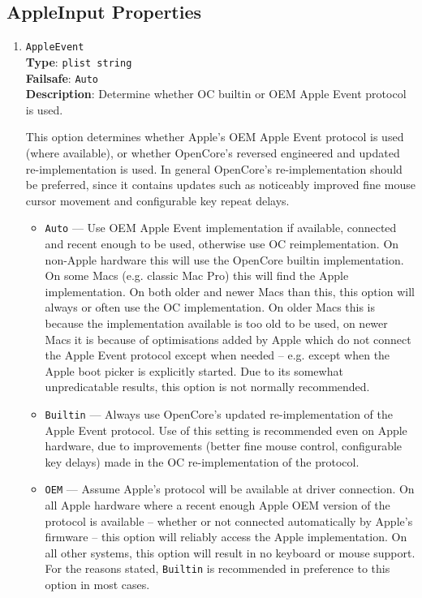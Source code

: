 \documentclass[]{article}
\providecommand{\tightlist}{%
  \setlength{\itemsep}{0pt}\setlength{\parskip}{0pt}}
\begin{document}
\begin{enumerate}
\end{enumerate}

\subsection{AppleInput Properties}\label{uefiappleinputprops}

\begin{enumerate}

  \item
  \texttt{AppleEvent}\\
  \textbf{Type}: \texttt{plist\ string}\\
  \textbf{Failsafe}: \texttt{Auto}\\
  \textbf{Description}: Determine whether OC builtin or OEM Apple Event protocol is used.

  This option determines whether Apple's OEM Apple Event protocol is used (where available), or
  whether OpenCore's reversed engineered and updated re-implementation is used. In general
  OpenCore's re-implementation should be preferred, since it contains updates such as noticeably
  improved fine mouse cursor movement and configurable key repeat delays.

  \begin{itemize}
  \tightlist
  \item \texttt{Auto} --- Use OEM Apple Event implementation if available, connected and
  recent enough to be used, otherwise use OC reimplementation.
  On non-Apple hardware this will use the OpenCore builtin implementation.
  On some Macs (e.g. classic Mac Pro) this will find the Apple implementation. On both older and
  newer Macs than this, this option will always or often use the OC implementation. On older Macs
  this is because the implementation available is too old to be used, on newer Macs it is
  because of optimisations added by Apple which do not connect the Apple Event protocol
  except when needed -- e.g. except when the Apple boot picker is explicitly started.
  Due to its somewhat unpredicatable results, this option is not normally recommended.
  \item \texttt{Builtin} ---  Always use OpenCore's updated re-implementation of the Apple Event protocol.
  Use of this setting is recommended even on Apple hardware, due to
  improvements (better fine mouse control, configurable key delays) made in the OC re-implementation
  of the protocol.
  \item \texttt{OEM} --- Assume Apple's protocol will be available at driver connection. On all Apple hardware
  where a recent enough Apple OEM version of the protocol is available -- whether or not connected automatically
  by Apple's firmware -- this option will reliably access the Apple implementation. On all other systems, this
  option will result in no keyboard or mouse support. For the reasons stated, \texttt{Builtin} is recommended in
  preference to this option in most cases.
  \end{itemize}


\end{enumerate}
\end{document}
